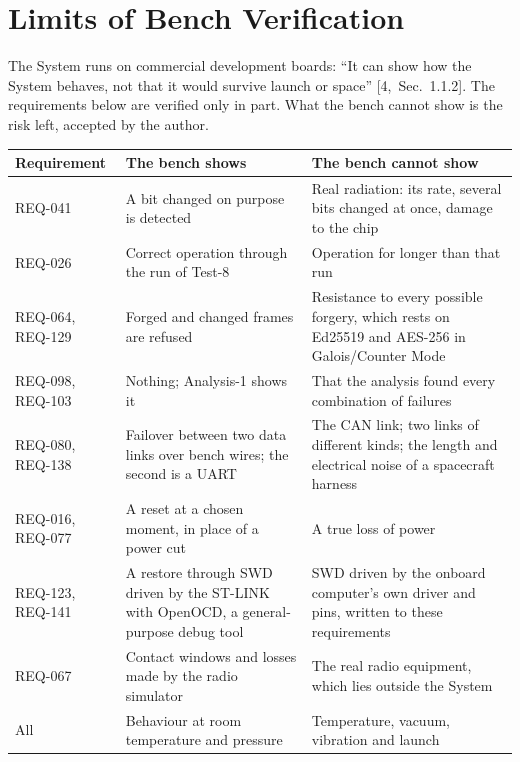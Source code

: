 \documentclass[11pt,a4paper]{article}
\renewcommand{\thesection}{\arabic{section}.0}
\renewcommand{\thesubsection}{\arabic{section}.\arabic{subsection}}
\begin{document}
\section{Limits of Bench Verification}
The System runs on commercial development boards: ``It can show how the System
behaves, not that it would survive launch or space'' [4,~Sec.~1.1.2]. The
requirements below are verified only in part. What the bench cannot show is
the risk left, accepted by the author.

\smallskip
{\small\noindent\begin{tabularx}{\textwidth}{@{}l>{\raggedright\arraybackslash}X>{\raggedright\arraybackslash}X@{}}
\toprule
Requirement & The bench shows & The bench cannot show \\
\midrule
REQ-041 & A bit changed on purpose is detected & Real radiation: its rate, several bits changed at once, damage to the chip \\
REQ-026 & Correct operation through the run of Test-8 & Operation for longer than that run \\
REQ-064, REQ-129 & Forged and changed frames are refused & Resistance to every possible forgery, which rests on Ed25519 and AES-256 in Galois/Counter Mode \\
REQ-098, REQ-103 & Nothing; Analysis-1 shows it & That the analysis found every combination of failures \\
REQ-080, REQ-138 & Failover between two data links over bench wires; the second is a UART & The CAN link; two links of different kinds; the length and electrical noise of a spacecraft harness \\
REQ-016, REQ-077 & A reset at a chosen moment, in place of a power cut & A true loss of power \\
REQ-123, REQ-141 & A restore through SWD driven by the ST-LINK with OpenOCD, a general-purpose debug tool & SWD driven by the onboard computer's own driver and pins, written to these requirements \\
REQ-067 & Contact windows and losses made by the radio simulator & The real radio equipment, which lies outside the System \\
All & Behaviour at room temperature and pressure & Temperature, vacuum, vibration and launch \\
\bottomrule
\end{tabularx}}

\appendix
\renewcommand{\thesection}{\Alph{section}}
\renewcommand{\thesubsection}{\Alph{section}.\arabic{subsection}}
\end{document}
